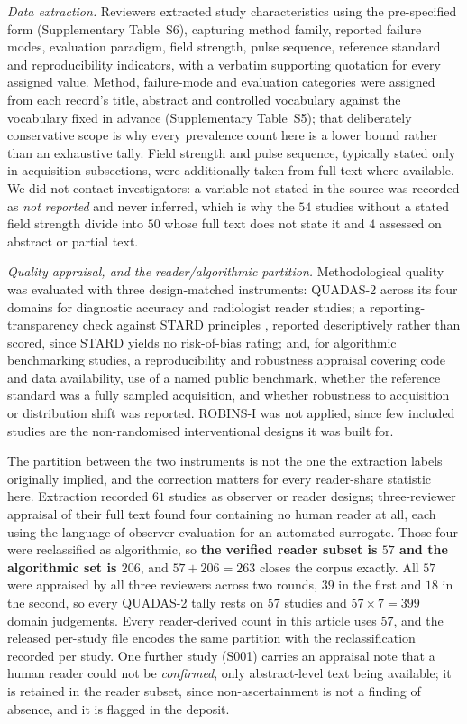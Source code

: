 \documentclass[review,authoryear]{elsarticle}
\begin{document}
\emph{Data extraction.} Reviewers extracted study characteristics using the pre-specified
form (Supplementary Table~S6), capturing method family, reported failure modes, evaluation
paradigm, field strength, pulse sequence, reference standard and reproducibility
indicators, with a verbatim supporting quotation for every assigned value. Method,
failure-mode and evaluation categories were assigned from each record's title, abstract and
controlled vocabulary against the vocabulary fixed in advance (Supplementary Table~S5);
that deliberately conservative scope is why every prevalence count here is a lower bound
rather than an exhaustive tally. Field strength and pulse sequence, typically stated only
in acquisition subsections, were additionally taken from full text where available. We did
not contact investigators: a variable not stated in the source was recorded as \emph{not
reported} and never inferred, which is why the $54$ studies without a stated field strength
divide into $50$ whose full text does not state it and $4$ assessed on abstract or partial
text.

\emph{Quality appraisal, and the reader/algorithmic partition.} Methodological quality was
evaluated with three design-matched instruments: QUADAS-2 \citep{whiting2011quadas} across
its four domains for diagnostic accuracy and radiologist reader studies; a
reporting-transparency check against STARD principles \citep{bossuyt2015stard}, reported
descriptively rather than scored, since STARD yields no risk-of-bias rating; and, for
algorithmic benchmarking studies, a reproducibility and robustness appraisal covering code
and data availability, use of a named public benchmark, whether the reference standard was
a fully sampled acquisition, and whether robustness to acquisition or distribution shift
was reported. ROBINS-I \citep{sterne2016robins} was not applied, since few included studies
are the non-randomised interventional designs it was built for.

The partition between the two instruments is not the one the extraction labels originally
implied, and the correction matters for every reader-share statistic here. Extraction
recorded $61$ studies as observer or reader designs; three-reviewer appraisal of their full
text found four containing no human reader at all, each using the language of observer
evaluation for an automated surrogate. Those four were reclassified as algorithmic, so
\textbf{the verified reader subset is $57$ and the algorithmic set is $206$}, and
$57 + 206 = 263$ closes the corpus exactly. All $57$ were appraised by all three reviewers
across two rounds, $39$ in the first and $18$ in the second, so every QUADAS-2 tally rests
on $57$ studies and $57 \times 7 = 399$ domain judgements. Every reader-derived count in
this article uses $57$, and the released per-study file encodes the same partition with the
reclassification recorded per study. One further study (S001) carries an appraisal note
that a human reader could not be \emph{confirmed}, only abstract-level text being
available; it is retained in the reader subset, since non-ascertainment is not a finding of
absence, and it is flagged in the deposit.
\end{document}
